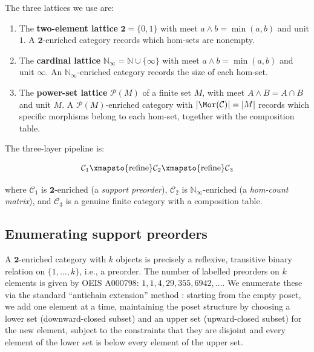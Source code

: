 \documentclass[12pt,a4paper]{amsart}
\theoremstyle{definition}
\theoremstyle{remark}
\newcommand{\cat}{\mathcal}
\begin{document}
The three lattices we use are:

\begin{enumerate}
\item The \textbf{two-element lattice} $\mathbf{2} = \{0, 1\}$ with
  meet $a \wedge b = \min(a,b)$ and unit $1$.
  A $\mathbf{2}$-enriched category records which hom-sets are nonempty.
\item The \textbf{cardinal lattice} $\mathbb{N}_\infty = \mathbb{N} \cup
  \{\infty\}$ with meet $a \wedge b = \min(a,b)$ and unit $\infty$.
  An $\mathbb{N}_\infty$-enriched category records the size of each
  hom-set.
\item The \textbf{power-set lattice} $\mathcal{P}(M)$ of a finite set $M$,
  with meet $A \wedge B = A \cap B$ and unit $M$.
  A $\mathcal{P}(M)$-enriched category with $|\Mor(\cat{C})| = |M|$
  records which specific morphisms belong to each hom-set, together with
  the composition table.
\end{enumerate}

The three-layer pipeline is:

\[
\cat{C}_1 \xmapsto{\text{refine}} \cat{C}_2 \xmapsto{\text{refine}} \cat{C}_3
\]

where $\cat{C}_1$ is $\mathbf{2}$-enriched (a \emph{support preorder}),
$\cat{C}_2$ is $\mathbb{N}_\infty$-enriched (a \emph{hom-count matrix}),
and $\cat{C}_3$ is a genuine finite category with a composition table.

\subsection{Enumerating support preorders}

A $\mathbf{2}$-enriched category with $k$ objects is precisely a
reflexive, transitive binary relation on $\{1,\dots,k\}$, i.e., a
preorder.  The number of labelled preorders on $k$ elements is given by
OEIS A000798: $1, 1, 4, 29, 355, 6942, \dots$.  We enumerate these via
the standard ``antichain extension'' method \cite{pfeiffer2004}: starting
from the empty poset, we add one element at a time, maintaining the poset
structure by choosing a lower set (downward-closed subset) and an upper
set (upward-closed subset) for the new element, subject to the constraints
that they are disjoint and every element of the lower set is below every
element of the upper set.
\end{document}
